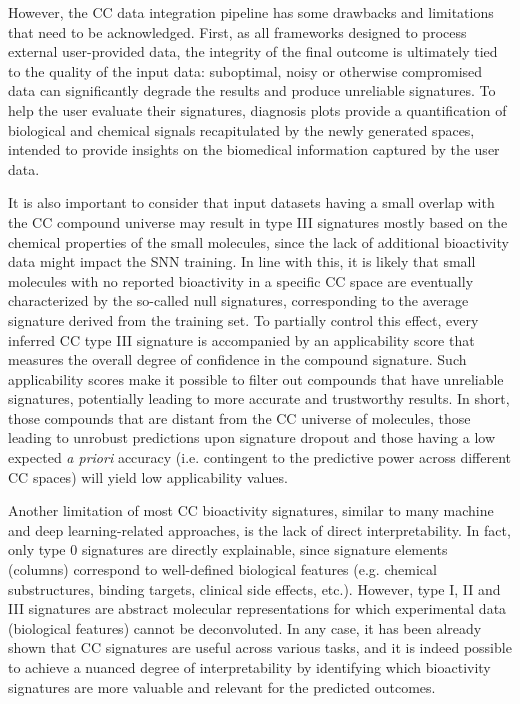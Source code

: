 However, the CC data integration pipeline has some drawbacks and limitations that need to be acknowledged. First, as all frameworks designed to process external user-provided data, the integrity of the final outcome is ultimately tied to the quality of the input data: suboptimal, noisy or otherwise compromised data can significantly degrade the results and produce unreliable signatures. To help the user evaluate their signatures, diagnosis plots provide a quantification of biological and chemical signals recapitulated by the newly generated spaces, intended to provide insights on the biomedical information captured by the user data.

It is also important to consider that input datasets having a small overlap with the CC compound universe may result in type III signatures mostly based on the chemical properties of the small molecules, since the lack of additional bioactivity data might impact the SNN training. In line with this, it is likely that small molecules with no reported bioactivity in a specific CC space are eventually characterized by the so-called null signatures, corresponding to the average signature derived from the training set. To partially control this effect, every inferred CC type III signature is accompanied by an applicability score that measures the overall degree of confidence in the compound signature. Such applicability scores make it possible to filter out compounds that have unreliable signatures, potentially leading to more accurate and trustworthy results. In short, those compounds that are distant from the CC universe of molecules, those leading to unrobust predictions upon signature dropout and those having a low expected \textit{a priori} accuracy (i.e. contingent to the predictive power across different CC spaces) will yield low applicability values.

Another limitation of most CC bioactivity signatures, similar to many machine and deep learning-related approaches\cite{jimenez-luna_artificial_2021, vamathevan_applications_2019}, is the lack of direct interpretability. In fact, only type 0 signatures are directly explainable, since signature elements (columns) correspond to well-defined biological features (e.g. chemical substructures, binding targets, clinical side effects, etc.). However, type I, II and III signatures are abstract molecular representations for which experimental data (biological features) cannot be deconvoluted. In any case, it has been already shown that CC signatures are useful across various tasks, and it is indeed possible to achieve a nuanced degree of interpretability by identifying which bioactivity signatures are more valuable and relevant for the predicted outcomes\cite{bertoni_bioactivity_2021}. 

